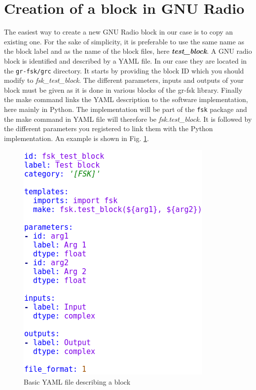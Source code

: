 \section{Creation of a block in GNU Radio}

The easiest way to create a new GNU Radio block in our case is to copy an existing one. For the sake of simplicity, it is preferable to use the same name as the block label and as the name of the block files, here \textit{\textbf{test\_block}}. A GNU radio block is identified and described by a YAML file. In our case they are located in the \texttt{gr-fsk/grc} directory. It starts by providing the block ID which you should modify to \textit{fsk\_test\_block}. The different parameters, inputs and outputs of your block must be given as it is done in various blocks of the gr-fsk library. Finally the make command links the YAML description to the software implementation, here mainly in Python. The implementation will be part of the \texttt{fsk} package and the make command in YAML file will therefore be \textit{fsk.test\_block}. It is followed by the different parameters you registered to link them with the Python implementation. An example is shown in Fig. \ref{fig:Basic_yml}.

\begin{figure}[h]
    \centering
    \includegraphics[scale=0.8, left]{figures/Basic_yml.png}
    \caption{Basic YAML file describing a block}
    \label{fig:Basic_yml}
\end{figure}

